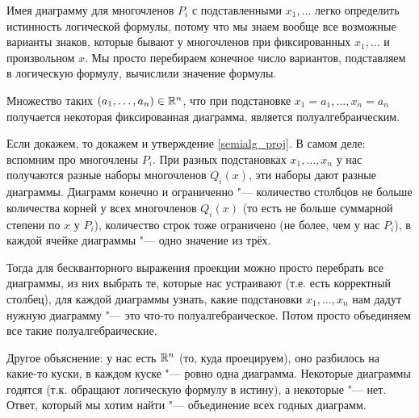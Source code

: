 	\begin{Rem}
		Имея диаграмму для многочленов $P_i$ с подставленными $x_1, \dots$ легко определить истинность логической формулы, потому что мы знаем вообще все возможные варианты знаков,
		которые бывают у многочленов при фиксированных $x_1, \dots$ и произвольном $x$.
		Мы просто перебираем конечное число вариантов, подставляем в логическую формулу, вычислили значение формулы.
	\end{Rem}

	\begin{assertion}\label{fix_diag_semialg}
		Множество таких $(a_1, \dots, a_n) \in \mathbb{R}^n$, что при подстановке $x_1=a_1, \dots, x_n=a_n$ получается некоторая фиксированная диаграмма, является полуалгебраическим.
	\end{assertion}
	\begin{Rem}
		Если докажем, то докажем и утверждение \ref{semialg_proj}.
		В самом деле: вспомним про многочлены $P_i$.
		При разных подстановках $x_1, \dots, x_n$ у нас получаются разные наборы многочленов $Q_i(x)$, эти наборы дают разные диаграммы.
		Диаграмм конечно и ограниченно "--- количество столбцов не больше количества корней у всех многочленов $Q_i(x)$ (то есть не больше суммарной степени по $x$ у $P_i$),
		количество строк тоже ограничено (не более, чем у нас $P_i$), в каждой ячейке диаграммы "--- одно значение из трёх.

		Тогда для бескванторного выражения проекции можно просто перебрать все диаграммы, из них выбрать те, которые нас устраивают (т.е. есть корректный столбец),
		для каждой диаграммы узнать, какие подстановки $x_1, \dots, x_n$ нам дадут нужную диаграмму "--- это что-то полуалгебраическое.
		Потом просто объединяем все такие полуалгебраические.
	\end{Rem}
	\begin{Rem}
		Другое объяснение: у нас есть $\mathbb{R}^n$ (то, куда проецируем), оно разбилось на какие-то куски, в каждом куске "--- ровно одна диаграмма.
		Некоторые диаграммы годятся (т.к. обращают логическую формулу в истину), а некоторые "--- нет.
		Ответ, который мы хотим найти "--- объединение всех годных диаграмм.
	\end{Rem}

